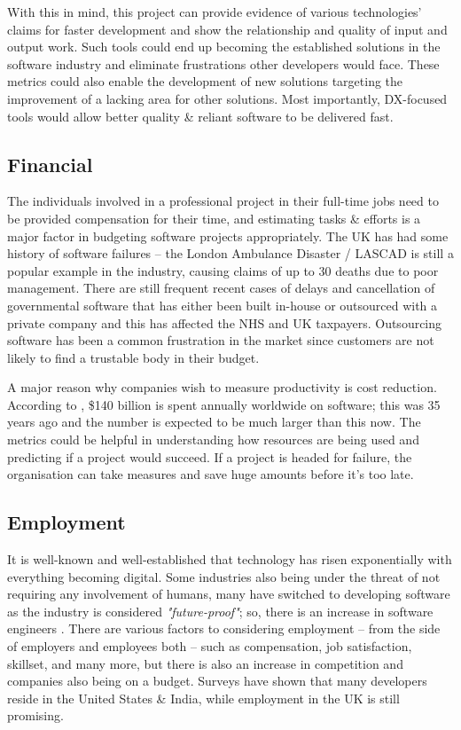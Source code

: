 \documentclass{prrcs}
\begin{document}
With this in mind, this project can provide evidence of various technologies' claims for faster development and show the relationship and quality of input and output work. Such tools could end up becoming the established solutions in the software industry and eliminate frustrations other developers would face. These metrics could also enable the development of new solutions targeting the improvement of a lacking area for other solutions. Most importantly, DX-focused tools would allow better quality \& reliant software to be delivered fast.

\subsection*{Financial}

The individuals involved in a professional project in their full-time jobs need to be provided compensation for their time, and estimating tasks \& efforts is a major factor in budgeting software projects appropriately. The UK has had some history of software failures -- the London Ambulance Disaster / LASCAD \cite{finkelsteinComedyErrorsLondon1996} is still a popular example in the industry, causing claims of up to 30 deaths due to poor management. There are still frequent recent cases of delays and cancellation of governmental software \cite{coieraLessonsNHSNational2007,HomeOfficeOrdered2014} that has either been built in-house or outsourced with a private company and this has affected the NHS and UK taxpayers. Outsourcing software has been a common frustration in the market since customers are not likely to find a trustable body in their budget.

A major reason why companies wish to measure productivity is cost reduction. According to \textcite{boehmImprovingSoftwareProductivity1987}, \$140 billion is spent annually worldwide on software; this was 35 years ago and the number is expected to be much larger than this now. The metrics could be helpful in understanding how resources are being used and predicting if a project would succeed. If a project is headed for failure, the organisation can take measures and save huge amounts before it's too late.

\subsection*{Employment}

It is well-known and well-established that technology has risen exponentially with everything becoming digital. Some industries also being under the threat of not requiring any involvement of humans, many have switched to developing software as the industry is considered \textit{"future-proof"}; so, there is an increase in software engineers \cite{labsHowManyProgrammers2022,TechCompaniesWant2020}. There are various factors to considering employment -- from the side of employers and employees both -- such as compensation, job satisfaction, skillset, and many more, but there is also an increase in competition and companies also being on a budget. Surveys have shown \cite{labsHowManyProgrammers2022,StackOverflowDeveloper,StateJS2021} that many developers reside in the United States \& India, while employment in the UK is still promising.
\end{document}
